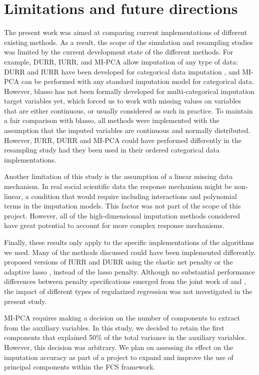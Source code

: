 \section{Limitations and future directions}

	The present work was aimed at comparing current implementations of different existing methods.
	As a result, the scope of the simulation and resampling studies was limited by the current development state of 
	the different methods.
	For example, DURR, IURR, and MI-PCA allow imputation of any type of data:
	DURR and IURR have been developed for categorical data imputation \citep{dengEtAl:2016},
	and MI-PCA can be performed with any standard imputation model for categorical data.
	However, blasso has not been formally developed for multi-categorical imputation target variables yet, 
	which forced us to work with missing values on variables that are either continuous, or usually 
	considered as such in practice.
	To maintain a fair comparison with blasso, all methods were implemented with the assumption that the imputed 
	variables are continuous and normally distributed.
	However, IURR, DURR and MI-PCA could have performed differently in the resampling study had they been used in their
	ordered categorical data implementations.

	Another limitation of this study is the assumption of a linear missing data mechanism.
	In real social scientific data the response mechanism might be non-linear, a condition that would require
	including interactions and polynomial terms in the imputation models.
	This factor was not part of the scope of this project. 
	However, all of the high-dimensional imputation methods considered have great potential to account for
	more complex response mechanisms.

	Finally, these results only apply to the specific implementations of the algorithms we used. 
	Many of the methods discussed could have been implemented differently.
	\cite{zhaoLong:2016} proposed versions of IURR and DURR using the elastic net penalty \citep{zouHastie:2005} or 
	the adaptive lasso \citep{zou:2006}, instead of the lasso penalty.
	Although no substantial performance differences between penalty specifications emerged 
	from the joint work of \cite{zhaoLong:2016} and \cite{dengEtAl:2016}, the impact of different types of 
	regularized regression was not investigated in the present study. 

	MI-PCA requires making a decision on the number of components to extract from the auxiliary 
	variables.
	In this study, we decided to retain the first components that explained 50\% of the total variance in the 
	auxiliary variables.
	However, this decision was arbitrary. 
	We plan on assessing its effect on the imputation accuracy as part of a project to 
	expand and improve the use of principal components within the FCS framework.

